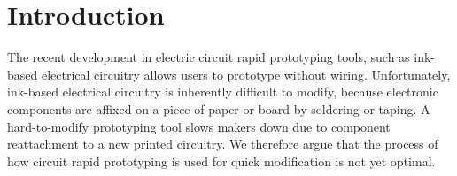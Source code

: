 \section{Introduction}

The recent development in electric circuit rapid prototyping tools, such as ink-based electrical circuitry allows users to prototype without wiring. Unfortunately, ink-based electrical circuitry is inherently difficult to modify, because electronic components are affixed on a piece of paper or board by soldering or taping. A hard-to-modify prototyping tool slows makers down due to component reattachment to a new printed circuitry. We therefore argue that the process of how circuit rapid prototyping is used for quick modification is not yet optimal.


